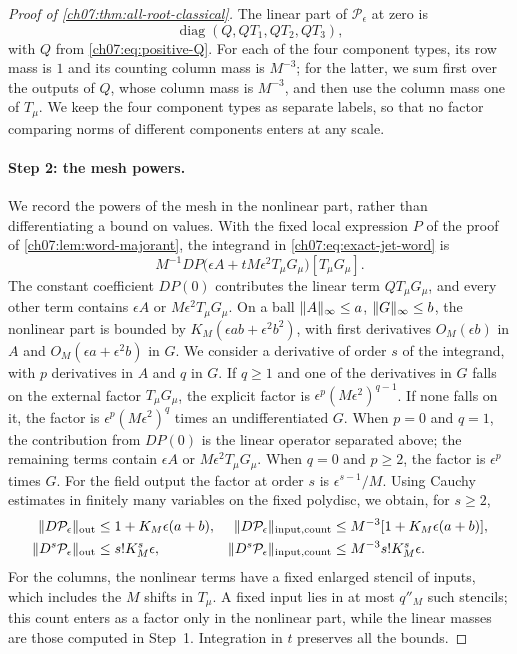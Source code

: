 \begin{proof}[Proof of \cref{ch07:thm:all-root-classical}]
The linear part of $\mathcal P_\epsilon$ at zero is
\[
 \operatorname{diag}(Q,QT_1,QT_2,QT_3),
\]
with $Q$ from \eqref{ch07:eq:positive-Q}. For each of the four component types, its row mass is $1$ and its counting column mass is $M^{-3}$; for the latter, we sum first over the outputs of $Q$, whose column mass is $M^{-3}$, and then use the column mass one of $T_\mu$. We keep the four component types as separate labels, so that no factor comparing norms of different components enters at any scale.

\paragraph{Step 2: the mesh powers.}
We record the powers of the mesh in the nonlinear part, rather than differentiating a bound on values. With the fixed local expression $P$ of the proof of \cref{ch07:lem:word-majorant}, the integrand in \eqref{ch07:eq:exact-jet-word} is
\begin{equation}\label{ch07:eq:jet-power-ledger}
 M^{-1}DP\bigl(\epsilon A+tM\epsilon^2T_\mu G_\mu\bigr)[T_\mu G_\mu].
\end{equation}
The constant coefficient $DP(0)$ contributes the linear term $QT_\mu G_\mu$, and every other term contains $\epsilon A$ or $M\epsilon^2T_\mu G_\mu$. On a ball $\lVert A\rVert_\infty\le a$, $\lVert G\rVert_\infty\le b$, the nonlinear part is bounded by $K_M(\epsilon ab+\epsilon^2b^2)$, with first derivatives $O_M(\epsilon b)$ in $A$ and $O_M(\epsilon a+\epsilon^2b)$ in $G$. We consider a derivative of order $s$ of the integrand, with $p$ derivatives in $A$ and $q$ in $G$. If $q\ge1$ and one of the derivatives in $G$ falls on the external factor $T_\mu G_\mu$, the explicit factor is $\epsilon^p(M\epsilon^2)^{q-1}$. If none falls on it, the factor is $\epsilon^p(M\epsilon^2)^q$ times an undifferentiated $G$. When $p=0$ and $q=1$, the contribution from $DP(0)$ is the linear operator separated above; the remaining terms contain $\epsilon A$ or $M\epsilon^2T_\mu G_\mu$. When $q=0$ and $p\ge2$, the factor is $\epsilon^p$ times $G$. For the field output the factor at order $s$ is $\epsilon^{s-1}/M$. Using Cauchy estimates in finitely many variables on the fixed polydisc, we obtain, for $s\ge2$,
\begin{equation}\label{ch07:eq:joint-word-tensors}
 \begin{aligned}
 \lVert D\mathcal P_\epsilon\rVert_{\mathrm{out}}&\le1+K_M\epsilon(a+b),&
 \lVert D\mathcal P_\epsilon\rVert_{\mathrm{input,count}}&\le M^{-3}[1+K_M\epsilon(a+b)],\\
 \lVert D^s\mathcal P_\epsilon\rVert_{\mathrm{out}}&\le s!K_M^s\epsilon,&
 \lVert D^s\mathcal P_\epsilon\rVert_{\mathrm{input,count}}&\le M^{-3}s!K_M^s\epsilon .
 \end{aligned}
\end{equation}
For the columns, the nonlinear terms have a fixed enlarged stencil of inputs, which includes the $M$ shifts in $T_\mu$. A fixed input lies in at most $q''_M$ such stencils; this count enters as a factor only in the nonlinear part, while the linear masses are those computed in Step~1. Integration in $t$ preserves all the bounds.


\end{proof}
